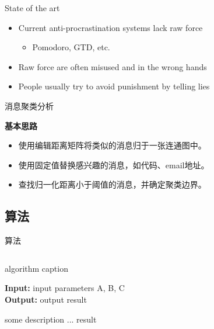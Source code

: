 \documentclass[UTF8,10pt,aspectratio=43]{ctexbeamer}
\begin{document}
\begin{frame}{State of the art}
  \begin{itemize}
    \item Current anti-procrastination systems lack raw force
    \begin{itemize}
      \item Pomodoro, GTD, etc.
    \end{itemize}
    \item Raw force are often misused and in the wrong hands
    \item People usually try to avoid punishment by telling lies
  \end{itemize}
\end{frame}

\begin{frame}{消息聚类分析}
  \begin{block}{\textbf{基本思路}}
	  \begin{itemize}
		  \item 使用编辑距离矩阵将类似的消息归于一张连通图中。
		  \item 使用固定值替换感兴趣的消息，如代码、email地址。
		  \item 查找归一化距离小于阈值的消息，并确定聚类边界。
	  \end{itemize}
  \end{block}
\end{frame}

\subsection{算法}
\begin{frame}{算法}
\begin{columns}[T] %
   	\begin{column}{.5\textwidth}
   	\begin{algorithm}[H]  
   		\caption{algorithm caption} %
   		\hspace*{0.02in} {\bf Input:} %
   		input parameters A, B, C\\
   		\hspace*{0.02in} {\bf Output:} %
   		output result 
   		\begin{algorithmic}[1] %
   		\State some description %
   		\State ...
   		\State \Return result	
   		\end{algorithmic}  
   \end{algorithm}
   \end{column}

   \hfill

   \begin{column}{.40\textwidth}
 
   \end{column}
   \end{columns}
\end{frame}
\end{document}
